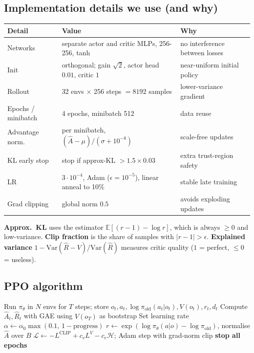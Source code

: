 \documentclass[11pt,a4paper]{article}
\newcommand{\E}{\mathbb{E}}
\begin{document}
\subsection{Implementation details we use (and why)}
\begin{center}
\begin{tabular}{lll}
\toprule
\textbf{Detail} & \textbf{Value} & \textbf{Why}\\
\midrule
Networks & separate actor and critic MLPs, 256-256, tanh & no interference between losses\\
Init & orthogonal; gain $\sqrt2$, actor head $0.01$, critic $1$ & near-uniform initial policy\\
Rollout & 32 envs $\times$ 256 steps $=8192$ samples & lower-variance gradient\\
Epochs / minibatch & 4 epochs, minibatch 512 & data reuse\\
Advantage norm. & per minibatch, $(\hat A-\mu)/(\sigma+10^{-8})$ & scale-free updates\\
KL early stop & stop if approx-KL $>1.5\times0.03$ & extra trust-region safety\\
LR & $3\cdot10^{-4}$, Adam ($\epsilon{=}10^{-5}$), linear anneal to 10\% & stable late training\\
Grad clipping & global norm $0.5$ & avoids exploding updates\\
\bottomrule
\end{tabular}
\end{center}
\textbf{Approx.\ KL} uses the estimator $\E[(r-1)-\log r]$, which is always $\ge0$ and low-variance.
\textbf{Clip fraction} is the share of samples with $|r-1|>\epsilon$.
\textbf{Explained variance} $1-\mathrm{Var}(\hat R-V)/\mathrm{Var}(\hat R)$ measures critic quality
($1$ = perfect, $\le0$ = useless).

\subsection{PPO algorithm}
\begin{algorithm}[h]
\caption{PPO (as implemented)}
\begin{algorithmic}[1]
  \State Run $\pi_{\theta}$ in $N$ envs for $T$ steps; store $o_t,a_t,\log\pi_\text{old}(a_t|o_t),V(o_t),r_t,d_t$
  \State Compute $\hat A_t,\hat R_t$ with GAE using $V(o_{T})$ as bootstrap
  \State Set learning rate $\alpha\leftarrow\alpha_0\max(0.1,\,1-\text{progress})$
      \State $r\leftarrow\exp(\log\pi_\theta(a|o)-\log\pi_\text{old})$, normalise $\hat A$ over $B$
      \State $\mathcal{L}\leftarrow -L^\text{CLIP}+c_v L^V-c_e\mathcal{H}$; Adam step with grad-norm clip
       \textbf{stop all epochs} \EndIf
    \EndFor
  \EndFor
\EndFor
\end{algorithmic}
\end{algorithm}
\end{document}
